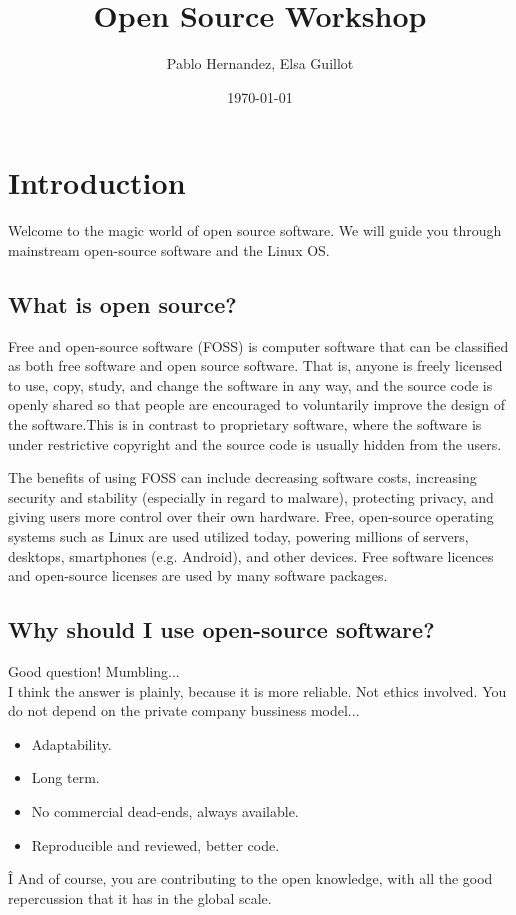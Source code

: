 \documentclass[a4paper]{article}
\title{Open Source Workshop}
\author{Pablo Hernandez, Elsa Guillot}
\date{\today}
\begin{document}
\maketitle



\section{Introduction}

Welcome to the magic world of open source software. We will guide you through mainstream open-source software and the Linux OS.
\subsection{What is open source?}

Free and open-source software (FOSS) is computer software that can be classified as both free software and open source software. That is, anyone is freely licensed to use, copy, study, and change the software in any way, and the source code is openly shared so that people are encouraged to voluntarily improve the design of the software.This is in contrast to proprietary software, where the software is under restrictive copyright and the source code is usually hidden from the users.

The benefits of using FOSS can include decreasing software costs, increasing security and stability (especially in regard to malware), protecting privacy, and giving users more control over their own hardware. Free, open-source operating systems such as Linux are used utilized today, powering millions of servers, desktops, smartphones (e.g. Android), and other devices. Free software licences and open-source licenses are used by many software packages.

\subsection{Why should I use open-source software?}
Good question! Mumbling...\\
I think the answer is plainly, because it is more reliable. Not ethics involved. You do not depend on the private company bussiness model...
\begin{itemize}
\item Adaptability.
\item Long term.
\item No commercial dead-ends, always available.
\item Reproducible and reviewed, better code.
\end{itemize}Î
And of course, you are contributing to the open knowledge, with all the good repercussion that it has in the global scale.
\end{document}
